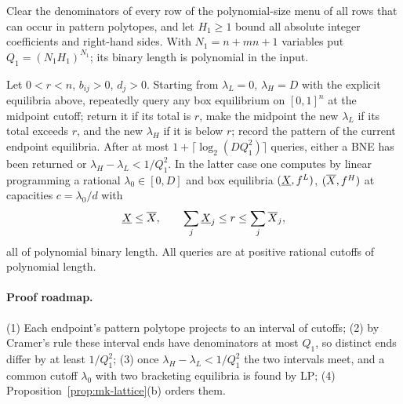 Clear the denominators of every row of the polynomial-size menu of all rows that can occur in pattern
polytopes, and let $H_1\ge1$ bound all absolute integer coefficients and right-hand sides. With
$N_1=n+mn+1$ variables put $Q_1=(N_1H_1)^{N_1}$; its binary length is polynomial in the input.

\begin{lemma}\label{lem:mk-bisect}
Let $0<r<n$, $b_{ij}>0$, $d_j>0$. Starting from $\lambda_L=0$, $\lambda_H=D$ with the explicit
equilibria above, repeatedly query any box equilibrium on $[0,1]^n$ at the midpoint cutoff; return it
if its total is $r$, make the midpoint the new $\lambda_L$ if its total exceeds $r$, and the new
$\lambda_H$ if it is below $r$; record the pattern of the current endpoint equilibria. After at most
$1+\lceil\log_2(DQ_1^2)\rceil$ queries, either a BNE has been returned or $\lambda_H-\lambda_L<1/Q_1^2$.
In the latter case one computes by linear programming a rational $\lambda_0\in[0,D]$ and box equilibria
$(\underline{X}{},f^L)$, $(\overline{X}{},f^H)$ at capacities $c=\lambda_0/d$ with
\[
\underline{X}{}\le \overline{X}{},\qquad \sum_j\underline{X}_j\le r\le\sum_j\overline{X}_j ,
\]
all of polynomial binary length. All queries are at positive rational cutoffs of polynomial length.
\end{lemma}

\paragraph{Proof roadmap.} (1) Each endpoint's pattern polytope projects to an interval of cutoffs; (2) by
Cramer's rule these interval ends have denominators at most $Q_1$, so distinct ends differ by at least
$1/Q_1^2$; (3) once $\lambda_H-\lambda_L<1/Q_1^2$ the two intervals meet, and a common cutoff
$\lambda_0$ with two bracketing equilibria is found by LP; (4) Proposition~\ref{prop:mk-lattice}(b)
orders them.

